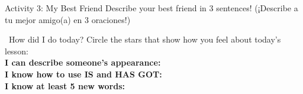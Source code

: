 \begin{activity}{Activity 3: My Best Friend}
  Describe your best friend in 3 sentences! (¡Describe a tu mejor amigo(a) en 3 oraciones!)
  \writinglines[3]
\end{activity}

\vspace{1em}
\begin{grammartip}{ \ How did I do today?}
  Circle the stars that show how you feel about today's lesson:\\[6pt]
  \textbf{I can describe someone's appearance:} \selfcheck[0] \\[4pt]
  \textbf{I know how to use IS and HAS GOT:} \selfcheck[0] \\[4pt]
  \textbf{I know at least 5 new words:} \selfcheck[0]
\end{grammartip}
